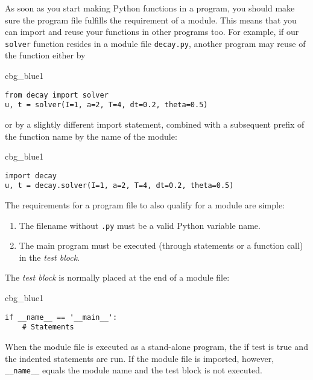 \documentclass[graybox,sectrefs,envcountresetchap,open=right,final]{svmonodo}
\newenvironment{_cod_tight}[1]{
   \def\FrameCommand{\colorbox{#1}}
   \FrameRule0.6pt\MakeFramed {\FrameRestore}\vskip3mm}
   {\vskip0mm\endMakeFramed}
\newenvironment{cod}[1]{
\bgroup\rmfamily
\fboxsep=0mm\relax
\begin{_cod_tight}{#1}
\list{}{\parsep=-2mm\parskip=0mm\topsep=0pt\leftmargin=2mm
\rightmargin=2\leftmargin\leftmargin=4pt\relax}
\item\relax}
{\endlist\end{_cod_tight}\egroup}
\begin{document}
As soon as you start making Python functions in a program, you should
make sure the program file fulfills the requirement of a module.
This means that you can import and reuse your functions in other
programs too. For example, if our \texttt{solver} function resides in a
module file \texttt{decay.py}, another program may reuse of the
function either by

\begin{cod}{cbg_blue1}\begin{Verbatim}[numbers=none,fontsize=\fontsize{9pt}{9pt},baselinestretch=0.95,xleftmargin=2mm]
from decay import solver
u, t = solver(I=1, a=2, T=4, dt=0.2, theta=0.5)
\end{Verbatim}
\end{cod}
\noindent
or by a slightly different import statement, combined with a subsequent
prefix of the function name by the name of the module:

\begin{cod}{cbg_blue1}\begin{Verbatim}[numbers=none,fontsize=\fontsize{9pt}{9pt},baselinestretch=0.95,xleftmargin=2mm]
import decay
u, t = decay.solver(I=1, a=2, T=4, dt=0.2, theta=0.5)
\end{Verbatim}
\end{cod}
\noindent

The requirements for a program file to also qualify for a module are simple:

\begin{enumerate}
\item The filename without \texttt{.py} must be a valid Python variable name.

\item The main program must be executed (through statements or
   a function call) in the \emph{test block}.
\end{enumerate}

\noindent
The \emph{test block} is normally placed at the end of a module file:

\begin{cod}{cbg_blue1}\begin{Verbatim}[numbers=none,fontsize=\fontsize{9pt}{9pt},baselinestretch=0.95,xleftmargin=2mm]
if __name__ == '__main__':
    # Statements
\end{Verbatim}
\end{cod}
\noindent
When the module file is executed as a stand-alone program, the if test
is true and the indented statements are run. If the module file
is imported, however, \Verb!__name__! equals the module name and the test block
is not executed.
\end{document}
